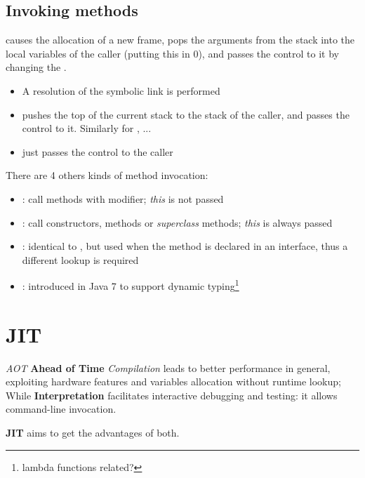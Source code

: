 \subsection{Invoking methods}
 causes the allocation of a new frame, pops the arguments from the stack into the local variables of the caller (putting this in 0),
and passes the control to it by changing the .
\begin{itemize}
    \item A resolution of the symbolic link is performed
    \item {} pushes the top of the current stack to the stack of the caller, and passes the control to it. Similarly for ,  ...
    \item {} just passes the control to the caller
\end{itemize}

There are 4 others kinds of method invocation:
\begin{itemize}
    \item {}: call methods with  modifier; \textit{this} is not passed
    \item {}: call constructors,  methods or \textit{superclass} methods; \textit{this} is always passed 
    \item {}: identical to , but used when the method is declared in an interface, thus a different lookup is required
    \item {}: introduced in Java 7 to support dynamic typing\footnote{lambda functions related?}
\end{itemize}


\section{JIT}
\textit{AOT} \textbf{Ahead of Time} \textit{Compilation} leads to better performance in general, exploiting hardware features and variables allocation without runtime lookup;
While \textbf{Interpretation} facilitates interactive debugging and testing: it allows command-line invocation.

\textbf{JIT} aims to get the advantages of both.

